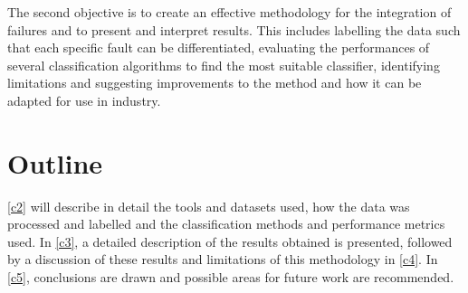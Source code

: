 The second objective is to create an effective methodology for the integration of failures and to present and interpret results. This includes labelling the data such that each specific fault can be differentiated, evaluating the performances of several classification algorithms to find the most suitable classifier, identifying limitations and suggesting improvements to the method and how it can be adapted for use in industry.

\section{Outline}

\autoref{c2} will describe in detail the tools and datasets used, how the data was processed and labelled and the classification methods and performance metrics used. In \autoref{c3}, a detailed description of the results obtained is presented, followed by a discussion of these results and limitations of this methodology in \autoref{c4}. In \autoref{c5}, conclusions are drawn and possible areas for future work are recommended.
